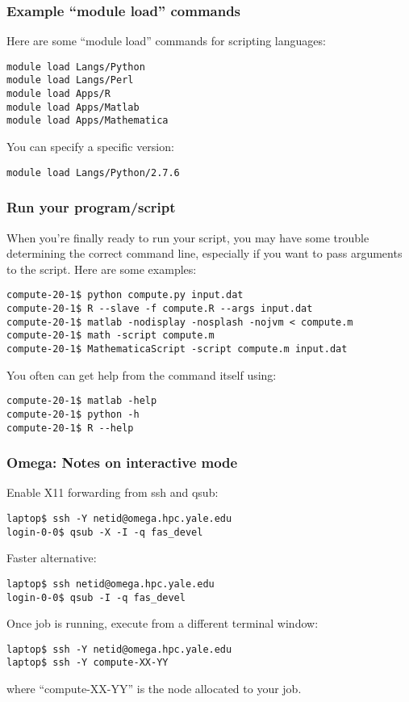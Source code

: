 \documentclass[10pt]{beamer}
\begin{document}
\begin{frame}[fragile]
\frametitle{Example ``module load'' commands}
Here are some ``module load'' commands for scripting languages:

\begin{verbatim}
module load Langs/Python
module load Langs/Perl
module load Apps/R
module load Apps/Matlab
module load Apps/Mathematica
\end{verbatim}

You can specify a specific version:
\begin{verbatim}
module load Langs/Python/2.7.6
\end{verbatim}

\end{frame}

\begin{frame}[fragile]
\frametitle{Run your program/script}
When you're finally ready to run your script, you may have some
trouble determining the correct command line, especially if you want to
pass arguments to the script.  Here are some examples:

\begin{verbatim}
compute-20-1$ python compute.py input.dat
compute-20-1$ R --slave -f compute.R --args input.dat
compute-20-1$ matlab -nodisplay -nosplash -nojvm < compute.m
compute-20-1$ math -script compute.m
compute-20-1$ MathematicaScript -script compute.m input.dat
\end{verbatim}

You often can get help from the command itself using:

\begin{verbatim}
compute-20-1$ matlab -help
compute-20-1$ python -h
compute-20-1$ R --help
\end{verbatim}
\end{frame}

\begin{frame}[fragile]
\frametitle{Omega: Notes on interactive mode}
Enable X11 forwarding from ssh and qsub:
\begin{verbatim}
laptop$ ssh -Y netid@omega.hpc.yale.edu
login-0-0$ qsub -X -I -q fas_devel
\end{verbatim}

Faster alternative:
\begin{verbatim}
laptop$ ssh netid@omega.hpc.yale.edu
login-0-0$ qsub -I -q fas_devel
\end{verbatim}

Once job is running, execute from a different terminal window:
\begin{verbatim}
laptop$ ssh -Y netid@omega.hpc.yale.edu
laptop$ ssh -Y compute-XX-YY
\end{verbatim}

where ``compute-XX-YY'' is the node allocated to your job.
\end{frame}
\end{document}
